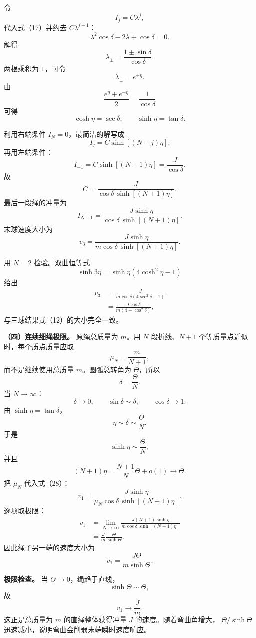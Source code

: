 \documentclass[12pt,a4paper,UTF8]{ctexart}
\begin{document}
令 \[
I_j=C\lambda^j, \tag{19}
\] 代入式（17）并约去 \(C\lambda^{j-1}\)： \[
\lambda^2\cos\delta-2\lambda+\cos\delta=0. \tag{20}
\] 解得 \[
\boxed{
\lambda_\pm
=\frac{1\pm\sin\delta}{\cos\delta}
}. \tag{21}
\] 两根乘积为 \(1\)，可令 \[
\lambda_\pm=e^{\pm\eta}. \tag{22}
\] 由 \[
\frac{e^\eta+e^{-\eta}}2
=\frac1{\cos\delta}
\] 可得 \[
\boxed{
\cosh\eta=\sec\delta,
\qquad
\sinh\eta=\tan\delta
}. \tag{23}
\]

利用右端条件 \(I_N=0\)，最简洁的解写成 \[
I_j=C\sinh[(N-j)\eta]. \tag{24}
\] 再用左端条件： \[
I_{-1}=C\sinh[(N+1)\eta]
=\frac{J}{\cos\delta}. \tag{25}
\] 故 \[
C=\frac{J}
{\cos\delta\,\sinh[(N+1)\eta]}. \tag{26}
\] 最后一段绳的冲量为 \[
\boxed{
I_{N-1}
=\frac{J\sinh\eta}
{\cos\delta\,\sinh[(N+1)\eta]}
}. \tag{27}
\] 末球速度大小为 \[
\boxed{
v_3
=\frac{J\sinh\eta}
{m\cos\delta\,\sinh[(N+1)\eta]}
}. \tag{28}
\]

用 \(N=2\) 检验。双曲恒等式 \[
\sinh3\eta=\sinh\eta\left(4\cosh^2\eta-1\right)
\] 给出 \[
\begin{aligned}
v_3
&=\frac{J}
{m\cos\delta(4\sec^2\delta-1)}\\
&=\frac{J\cos\delta}
{m(4-\cos^2\delta)},
\end{aligned}
\] 与三球结果式（12）的大小完全一致。

\textbf{（四）连续细绳极限。} 原绳总质量为 \(m\)。用 \(N\)
段折线、\(N+1\) 个等质量点近似时，每个质点质量应取 \[
\mu_N=\frac{m}{N+1}, \tag{29}
\] 而不是继续使用总质量 \(m\)。圆弧总转角为 \(\Theta\)，所以 \[
\delta=\frac{\Theta}{N}. \tag{30}
\] 当 \(N\to\infty\)： \[
\delta\to0,\qquad
\sin\delta\sim\delta,\qquad
\cos\delta\to1. \tag{31}
\] 由 \(\sinh\eta=\tan\delta\)， \[
\eta\sim\delta\sim\frac{\Theta}{N}. \tag{32}
\] 于是 \[
\sinh\eta\sim\frac{\Theta}{N}, \tag{33}
\] 并且 \[
(N+1)\eta
=\frac{N+1}{N}\Theta+o(1)
\longrightarrow\Theta. \tag{34}
\] 把 \(\mu_N\) 代入式（28）： \[
v_1
=\frac{J\sinh\eta}
{\mu_N\cos\delta\,\sinh[(N+1)\eta]}. \tag{35}
\] 逐项取极限： \[
\begin{aligned}
v_1
&=\lim_{N\to\infty}
\frac{J(N+1)\sinh\eta}
{m\cos\delta\,\sinh[(N+1)\eta]}\\
&=\frac{J}{m}
\frac{\Theta}{\sinh\Theta}.
\end{aligned} \tag{36}
\] 因此绳子另一端的速度大小为 \[
\boxed{
v_1=\frac{J\Theta}{m\sinh\Theta}
}. \tag{37}
\]

\textbf{极限检查。} 当 \(\Theta\to0\)，绳趋于直线， \[
\sinh\Theta\sim\Theta,
\] 故 \[
v_1\to\frac Jm. \tag{38}
\] 这正是总质量为 \(m\) 的直绳整体获得冲量 \(J\)
的速度。随着弯曲角增大， \(\Theta/\sinh\Theta\)
迅速减小，说明弯曲会削弱末端瞬时速度响应。
\end{document}
